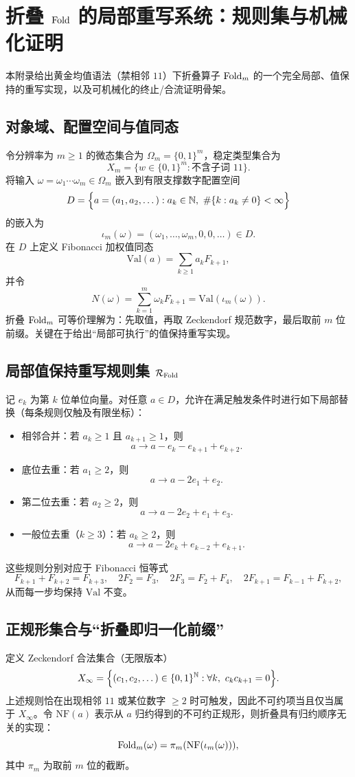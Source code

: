 \section{折叠 \texorpdfstring{$\mathrm{Fold}$}{Fold} 的局部重写系统：规则集与机械化证明}\label{app:fold-rewriting}

本附录给出黄金均值语法（禁相邻 $11$）下折叠算子 $\mathrm{Fold}_m$ 的一个完全局部、值保持的重写实现，以及可机械化的终止/合流证明骨架。

\subsection{对象域、配置空间与值同态}
令分辨率为 $m\ge 1$ 的微态集合为 $\Omega_m=\{0,1\}^m$，稳定类型集合为
$$
X_m=\{w\in\{0,1\}^m:\text{不含子词 }11\}.
$$
将输入 $\omega=\omega_1\cdots\omega_m\in\Omega_m$ 嵌入到有限支撑数字配置空间
$$
D=\Bigl\{a=(a_1,a_2,\dots): a_k\in\NN,\ \#\{k:a_k\ne 0\}<\infty\Bigr\}
$$
的嵌入为
$$
\iota_m(\omega)=(\omega_1,\dots,\omega_m,0,0,\dots)\in D.
$$
在 $D$ 上定义 Fibonacci 加权值同态
$$
\mathrm{Val}(a)=\sum_{k\ge 1} a_k F_{k+1},
$$
并令
$$
N(\omega)=\sum_{k=1}^m \omega_k F_{k+1}=\mathrm{Val}(\iota_m(\omega)).
$$
折叠 $\mathrm{Fold}_m$ 可等价理解为：先取值，再取 Zeckendorf 规范数字，最后取前 $m$ 位前缀。关键在于给出“局部可执行”的值保持重写实现。

\subsection{局部值保持重写规则集 \texorpdfstring{$\mathcal{R}_{\mathrm{Fold}}$}{R\_Fold}}
记 $e_k$ 为第 $k$ 位单位向量。对任意 $a\in D$，允许在满足触发条件时进行如下局部替换（每条规则仅触及有限坐标）：
\begin{itemize}
  \item[$(\mathrm{R}_{\mathrm{adj}})$] 相邻合并：若 $a_k\ge 1$ 且 $a_{k+1}\ge 1$，则
  $$
  a \to a-e_k-e_{k+1}+e_{k+2}.
  $$
  \item[$(\mathrm{R}_1)$] 底位去重：若 $a_1\ge 2$，则
  $$
  a \to a-2e_1+e_2.
  $$
  \item[$(\mathrm{R}_2)$] 第二位去重：若 $a_2\ge 2$，则
  $$
  a \to a-2e_2+e_1+e_3.
  $$
  \item[$(\mathrm{R}_k)$] 一般位去重（$k\ge 3$）：若 $a_k\ge 2$，则
  $$
  a \to a-2e_k+e_{k-2}+e_{k+1}.
  $$
\end{itemize}
这些规则分别对应于 Fibonacci 恒等式
$$
F_{k+1}+F_{k+2}=F_{k+3},\quad
2F_2=F_3,\quad
2F_3=F_2+F_4,\quad
2F_{k+1}=F_{k-1}+F_{k+2},
$$
从而每一步均保持 $\mathrm{Val}$ 不变。

\subsection{正规形集合与“折叠即归一化前缀”}
定义 Zeckendorf 合法集合（无限版本）
$$
X_\infty=\Bigl\{(c_1,c_2,\dots)\in\{0,1\}^{\mathbb{N}}:\forall k,\ c_kc_{k+1}=0\Bigr\}.
$$
上述规则恰在出现相邻 $11$ 或某位数字 $\ge 2$ 时可触发，因此不可约项当且仅当属于 $X_\infty$。令 $\mathrm{NF}(a)$ 表示从 $a$ 归约得到的不可约正规形，则折叠具有归约顺序无关的实现：
$$
\mathrm{Fold}_m(\omega)=\pi_m(\mathrm{NF}(\iota_m(\omega))),
$$
其中 $\pi_m$ 为取前 $m$ 位的截断。

